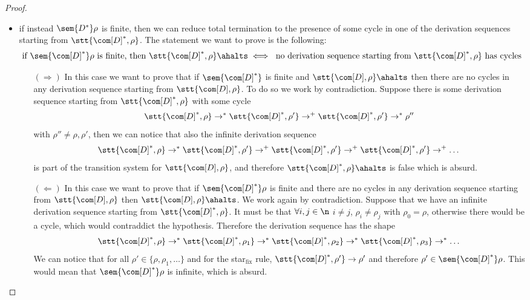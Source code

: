 \begin{proof}
\begin{itemize}
  \item if instead \(\sem{D^*}\rho\) is finite, then we can
    reduce total termination to the presence of some cycle in one of
    the derivation sequences starting from
    \(\stt{\com[D]^*, \rho}\). The statement we want to prove is the
    following:
    \begin{equation*}
      \text{if }\sem{\com[D]^*}\rho \text{ is finite, then } \stt{\com[D]^*, \rho} \ahalts \iff \text{ no derivation sequence starting from } \stt{\com[D]^*, \rho} \text{ has cycles}
    \end{equation*}
    \begin{itemize}
    \item[\((\Rightarrow)\)] In this case we want to prove that if
      \(\sem{\com[D]^*}\) is finite and
      \(\stt{\com[D], \rho} \ahalts\) then there are no cycles in
      any derivation sequence starting from \(\stt{\com[D],
        \rho}\). To do so we work by contradiction. Suppose there is
      some derivation sequence starting from
      \(\stt{\com[D]^*, \rho}\) with some cycle
      \begin{equation*}
        \stt{\com[D]^*, \rho} \to^* \stt{\com[D]^*, \rho'} \to^+ \stt{\com[D]^*, \rho'} \to^* \rho''
      \end{equation*}
      with \(\rho''\neq \rho, \rho'\), then we can notice that also
      the infinite derivation sequence
      \begin{equation*}
        \stt{\com[D]^*, \rho} \to^* \stt{\com[D]^*, \rho'} \to^+ \stt{\com[D]^*, \rho'} \to^+ \stt{\com[D]^*, \rho'} \to^+ \dots
      \end{equation*}
      is part of the transition system for \(\stt{\com[D], \rho}\),
      and therefore \(\stt{\com[D]^*, \rho} \ahalts\) is false which
      is absurd.
    \item[\((\Leftarrow)\)] In this case we want to prove that if
      \(\sem{\com[D]^*}\rho\) is finite and there are no cycles in any
      derivation sequence starting from \(\stt{\com[D], \rho}\) then
      \(\stt{\com[D], \rho} \ahalts\). We work again by
      contradiction. Suppose that we have an infinite derivation
      sequence starting from \(\stt{\com[D]^*, \rho}\). It must be
      that \(\forall i,j \in \n\) \(i \neq j\), \(\rho_i \neq \rho_j\)
      with \(\rho_0 = \rho\), otherwise there would be a cycle, which
      would contraddict the hypothesis. Therefore the derivation
      sequence has the shape
      \begin{equation*}
        \stt{\com[D]^*, \rho} \to^* \stt{\com[D]^*, \rho_1} \to^* \stt{\com[D]^*, \rho_2} \to^* \stt{\com[D]^*, \rho_3} \to^* \dots
      \end{equation*}
      We can notice that for all \(\rho' \in \{\rho, \rho_1, \dots\}\)
      and for the star\(_{\text{fix}}\) rule,
      \(\stt{\com[D]^*, \rho'} \to \rho'\) and therefore
      \(\rho'\in \sem{\com[D]^*}\rho\). This would mean that
      \(\sem{\com[D]^*}\rho\) is infinite, which is absurd.
    \end{itemize}


\end{itemize}
\end{proof}
